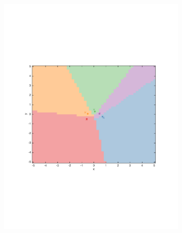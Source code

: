 \documentclass[preprint, 12pt]{elsarticle}
\begin{document}
\begin{figure}[htp!]
	\begin{subfigure}[t]{0.485\textwidth}
		\includegraphics[width=\textwidth, trim={15mm 80mm 20mm 75mm}]{Graphics/marketarea_mu05_nratio2.pdf}
		\caption{}
		\label{fig:marketarea_mu05}
	\end{subfigure}
	~
	\begin{subfigure}[t]{0.485\textwidth}

\end{subfigure}
\end{figure}
\end{document}
